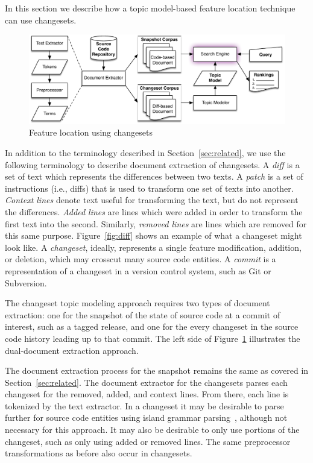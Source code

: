 In this section we describe how a topic model-based feature location
technique can use changesets.



\begin{figure}
\centerline{\includegraphics[width=.75\textwidth]{figures/changeset-flt}}
\caption{Feature location using changesets}
\label{fig:changeset}
\end{figure}

In addition to the terminology described in Section~\ref{sec:related},
we use the following terminology to describe document extraction of changesets.
A \textit{diff} is a set of text which represents the differences between two texts.
A \textit{patch} is a set of instructions (i.e., diffs) that is used to transform one set of texts into another.
\textit{Context lines} denote text useful for transforming the text, but do not represent the differences.
\textit{Added lines} are lines which were added in order to transform the first text into the second.
Similarly, \textit{removed lines} are lines which are removed for this same purpose.
Figure~\ref{fig:diff} shows an example of what a changeset might look like.
A \textit{changeset}, ideally, represents a single feature modification,
addition, or deletion, which may crosscut many source code entities.
A \textit{commit} is a representation of a changeset in a version control system, such as Git or Subversion.

The changeset topic modeling approach requires two types of document extraction:
one for the snapshot of the state of source code at a commit of interest, such as a tagged release,
and one for the every changeset in the source code history leading up to that commit.
The left side of Figure~\ref{fig:changeset} illustrates the dual-document extraction approach.

The document extraction process for the snapshot remains the same as covered in Section~\ref{sec:related}.
The document extractor for the changesets parses each changeset for the removed, added, and context lines.
From there, each line is tokenized by the text extractor.
In a changeset it may be desirable to parse further for source code entities using island grammar parsing~\cite{Moonen:2001},
although not necessary for this approach.
It may also be desirable to only use portions of the changeset, such as only using added or removed lines.
The same preprocessor transformations as before also occur in changesets.

